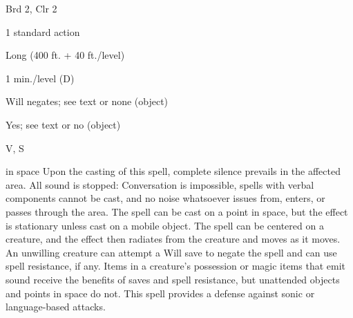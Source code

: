 
\begin{description*}
\item[Level:] Brd 2, Clr 2
\item[Casting Time:] 1 standard action
\item[Range:] Long (400 ft. + 40 ft./level)
\item[Duration:] 1 min./level (D)
\item[Saving Throw:] Will negates; see text or none (object)
\item[Spell Resistance:] Yes; see text or no (object)
\item[Components:] V, S
\end{description*}

in space
Upon the casting of this spell, complete silence prevails in the affected area.
All sound is stopped: Conversation is impossible, spells with verbal components
cannot be cast, and no noise whatsoever issues from, enters, or passes through
the area. The spell can be cast on a point in space, but the effect is stationary
unless cast on a mobile object. The spell can be centered on a creature, and the
effect then radiates from the creature and moves as it moves. An unwilling creature
can attempt a Will save to negate the spell and can use spell resistance, if any.
Items in a creature's possession or magic items that emit sound receive the benefits
of saves and spell resistance, but unattended objects and points in space do not.
This spell provides a defense against sonic or language-based attacks.